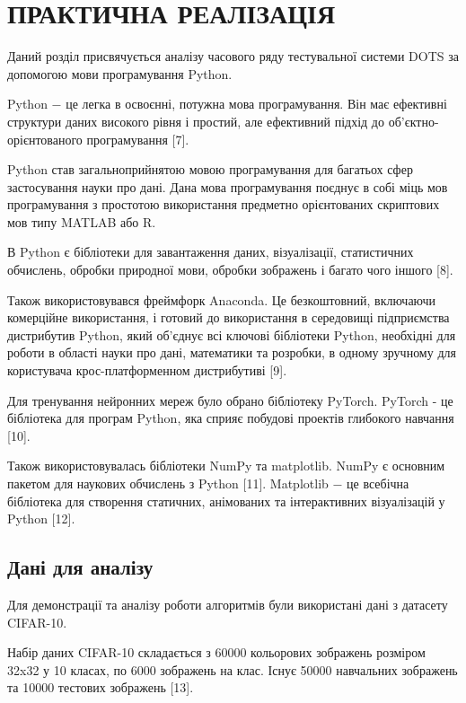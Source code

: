 \section{ПРАКТИЧНА РЕАЛІЗАЦІЯ}

Даний розділ присвячується аналізу часового ряду тестувальної системи DOTS за допомогою мови програмування Python. 

Python $-$ це легка в освоєнні, потужна мова програмування. Він має ефективні структури даних високого рівня і простий, але ефективний підхід до об'єктно-орієнтованого програмування [7].

Python став загальноприйнятою мовою програмування для багатьох сфер застосування науки про дані. Дана мова програмування поєднує в собі міць мов програмування з простотою використання предметно орієнтованих скриптових мов типу MATLAB або R. 

В Python є бібліотеки для завантаження даних, візуалізації, статистичних обчислень, обробки природної мови, обробки зображень і багато чого іншого [8].

Також використовувався фреймфорк Anaconda. Це безкоштовний, включаючи комерційне використання, і готовий до використання в середовищі підприємства дистрибутив Python, який об'єднує всі ключові бібліотеки Python, необхідні для роботи в області науки про дані, математики та розробки, в одному зручному для користувача крос-платформенном дистрибутиві [9].

Для тренування нейронних мереж було обрано бібліотеку PyTorch. PyTorch - це бібліотека для програм Python, яка сприяє побудові проектів глибокого навчання [10].

Також використовувалась бібліотеки NumPy та matplotlib. NumPy є основним пакетом для наукових обчислень з Python [11]. Matplotlib $-$ це всебічна бібліотека для створення статичних, анімованих та інтерактивних візуалізацій у Python [12]. 

\subsection{Дані для аналізу}

Для демонстрації та аналізу роботи алгоритмів були використані дані з датасету CIFAR-10.

Набір даних CIFAR-10 складається з 60000 кольорових зображень розміром 32x32 у 10 класах, по 6000 зображень на клас. Існує 50000 навчальних зображень та 10000 тестових зображень [13].

